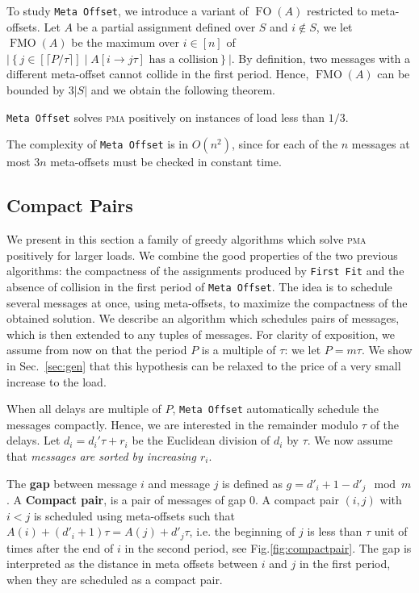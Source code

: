 \documentclass[a4paper,UKenglish,cleveref, autoref, thm-restate]{lipics-v2019}
\DeclareMathOperator{\Fo}{FO}
\DeclareMathOperator{\Fmo}{FMO}
\newcommand\pma{\textsc{pma}\xspace}
\newcommand\firstfit{\texttt{First Fit}\xspace}
\newcommand\metaoffset{\texttt{Meta Offset}\xspace}
\begin{document}
To study \metaoffset, we introduce a variant of $\Fo(A)$ restricted to meta-offsets.
 Let $A$ be a partial assignment defined over $S$ and $i\notin S$, we let $\Fmo(A)$ be the maximum over $i \in [n]$ of $|\left\{ j \in [\lceil P / \tau \rceil] \mid A[i \rightarrow j\tau] \text{ has a collision}\right\}|$.
 By definition, two messages with a different meta-offset cannot collide in the first period. Hence, $\Fmo(A)$ can be bounded by $3|S|$ and we obtain the following theorem.


\begin{theorem}\label{th:metaoffset}
\metaoffset solves \pma positively on instances of load less than $1/3$.
\end{theorem}

The complexity of \metaoffset is in $O(n^2)$, since for each of the $n$ messages at most $3n$ meta-offsets must be checked in constant time. 



\subsection{Compact Pairs}

We present in this section a family of greedy algorithms which solve \pma positively for larger loads. We combine the good properties of the two previous algorithms: the compactness of the assignments produced by \firstfit and the absence of collision in the first period of \metaoffset. The idea is to schedule several messages at once, using meta-offsets, to maximize the compactness of the obtained solution. We describe an algorithm which schedules pairs of messages, which is then extended to any tuples of messages.
For clarity of exposition, we assume from now on that the period $P$ is a multiple of $\tau$: we let $P = m\tau$. We show in Sec.~\ref{sec:gen} that this hypothesis can be relaxed 
to the price of a very small increase to the load. 


When all delays are multiple of $P$, \metaoffset automatically schedule the messages compactly.
Hence, we are interested in the remainder modulo $\tau$ of the delays. 
Let $d_i = d_{i}'\tau + r_i$ be the Euclidean division of $d_i$ by $\tau$. We now assume that \emph{messages are sorted by increasing $r_i$}.

The \textbf{gap} between message $i$ and message $j$ is defined as  $g = d'_{i} + 1 - d'_{j} \mod m$.
A \textbf{Compact pair}, is a pair of messages of gap $0$. A compact pair $(i,j)$ with $i < j$ is scheduled using meta-offsets such that $A(i) + (d'_i+1)\tau = A(j) + d'_j\tau$, i.e. the beginning of $j$ is less than $\tau$ unit of times after the end of $i$ in the second period, see Fig.\ref{fig:compactpair}. The gap is interpreted as the distance in meta offsets between $i$ and $j$ in the first period, when they are scheduled as a compact pair.
\end{document}
